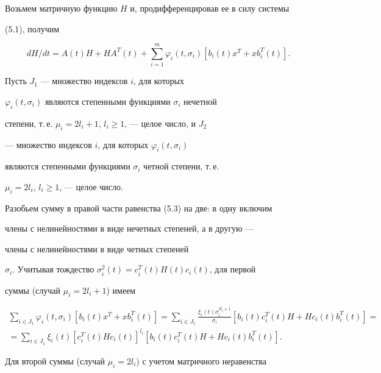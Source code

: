  


Возьмем матричную функцию $H$ и, продифференцировав ее в силу системы 


(5.1), получим 


\begin{equation} 


d H/d t=A(t)H+H A^T(t)+\sum^m_{i=1}\varphi_i(t,\sigma_i) 


[b_i(t)x^T+x b^T_i(t)]. 


\end{equation} 


 


Пусть $J_1$ --- множество индексов $i$, для которых 


$\varphi_i(t,\sigma_i)$ являются степенными функциями $\sigma_i$ нечетной 


степени, т.\,е. $\mu_i=2l_i+1$, $l_i\ge1$, --- целое число, и $J_2$ 


--- множество индексов $i$, для которых $\varphi_i(t,\sigma_i)$ 


являются степенными функциями $\sigma_i$ четной степени, т.\,е. 


$\mu_i=2l_i$, $l_i\ge1$, --- целое число. 


Разобьем сумму в правой части равенства (5.3) на две: в одну включим 


члены с нелинейностями в виде нечетных степеней, а в другую --- 


члены с нелинейностями в виде четных степеней 


$\sigma_i$. Учитывая тождество $\sigma^2_i(t)=c^T_i(t)H(t)c_i(t)$, для первой 


суммы (случай $\mu_i=2l_i+1$) имеем 


\begin{multline*} 


\sum_{i\in J_1}\varphi_i(t,\sigma_i) 


[b_i(t)x^T+x b^T_i(t)]=\sum_{i\in J_1} 


\frac{\xi_i(t)\sigma^{2l_i+1}_i}{\sigma_i} 


[b_i(t)c^T_i(t)H+H c_i(t)b^T_i(t)]= \\ 


% 


=\sum_{i\in J_1}\xi_i(t)[c^T_i(t)H c_i(t)]^{l_i} 


[b_i(t)c^T_i(t)H+H c_i(t)b^T_i(t)]. 


\end{multline*} 


Для второй суммы (случай $\mu_i=2l_i$) с учетом матричного неравенства 


